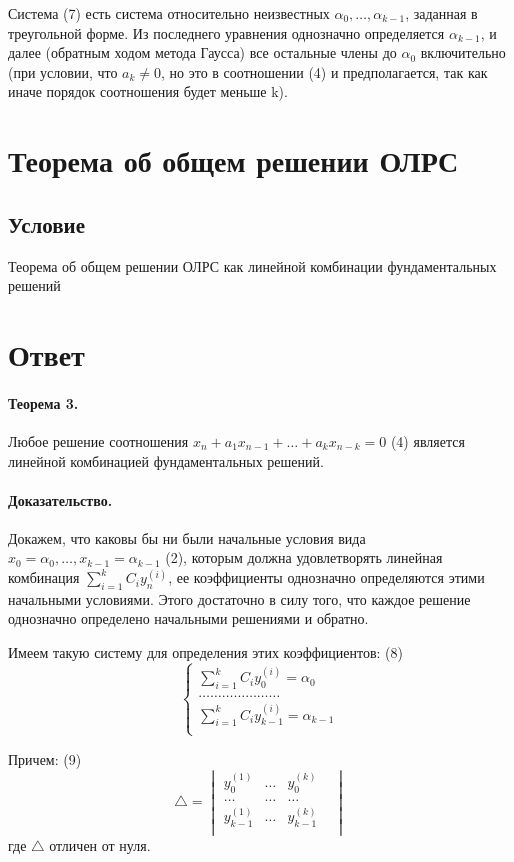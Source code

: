 \documentclass{report}
\begin{document}
Система (7) есть система относительно неизвестных $\alpha_0,\ldots,\alpha_{k-1}$,
заданная в треугольной форме. Из последнего уравнения однозначно определяется
$\alpha_{k-1}$, и далее (обратным ходом метода Гаусса) все остальные члены до $\alpha_0$
включительно (при условии, что $a_{k} \neq 0$, но это в соотношении (4) и предполагается,
так как иначе порядок соотношения будет меньше k).

\newpage

\section{Теорема об общем решении ОЛРС}
\subsection{Условие}
Теорема об общем решении ОЛРС как линейной комбинации фундаментальных
решений

\section{Ответ}
\paragraph*{Теорема 3.}
Любое решение соотношения $x_{n}+a_1x_{n-1}+\ldots+a_{k}x_{n-k} = 0$ (4)
является линейной комбинацией фундаментальных решений.

\paragraph*{Доказательство.}
Докажем, что каковы бы ни были начальные условия вида
$x_0=\alpha_0, \ldots, x_{k-1}=\alpha_{k-1}$ (2), которым должна удовлетворять
линейная комбинация $\sum_{i=1}^{k}C_{i}y^{(i)}_{n} $, ее коэффициенты
однозначно определяются этими начальными условиями. Этого достаточно в силу
того, что каждое решение однозначно определено начальными решениями и обратно.

Имеем такую систему для определения этих коэффициентов: (8)
\[
\begin{cases}
	\sum_{i=1}^{k}C_{i}y^{(i)}_{0} = \alpha_0\\ 
	\ldots\ldots\ldots\ldots\ldots\ldots\ldots\\
	\sum_{i=1}^{k}C_{i}y^{(i)}_{k-1} = \alpha_{k-1}\\ 
\end{cases}
\] 

Причем: (9)
\[
	\triangle = \begin{vmatrix}
		y_{0}^{(1)}& \ldots& y_{0}^{(k)}&\\
		\ldots& \ldots& \ldots& \\
		y_{k-1}^{(1)}& \ldots& y_{k-1}^{(k)}&\\
	\end{vmatrix}
\] 
где $\triangle$ отличен от нуля.
\end{document}
